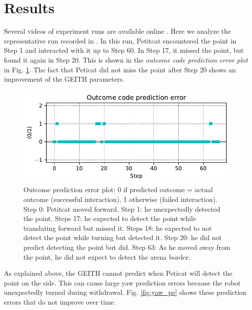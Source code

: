 \documentclass[runningheads]{llncs}
\begin{document}
\section{Results}
\label{sec:results}

Several videos of experiment runs are available online \cite{georgeon_petitcat_playlist}. 
Here we analyze the representative run recorded in \cite{georgeon_petitcat_2024}.
In this run, Petitcat encountered the point in Step 1 and interacted with it up to Step 60.
In Step 17, it missed the point, but found it again in Step 20.
This is shown in the \textit{outcome code prediction error plot} in Fig. \ref{fig:outcome}. 
The fact that Peticat did not miss the point after Step 20 shows an improvement of the GEITH parameters.

\begin{figure}
	\includegraphics[width=\textwidth]{01_Outcome_code.pdf}
	\caption{Outcome prediction error plot: 0 if predicted outcome = actual outcome (successful interaction), 1 otherwise (failed interaction).
	Step 0: Petitcat moved forward.
	Step 1: he unexpectedly detected the point.
	Steps 17: he expected to detect the point while translating forward but missed it.
	Steps 18: he expected to not detect the point while turning but detected it.
	Step 20: he did not predict detecting the point but did. 
	Step 63: As he moved away from the point, he did not expect to detect the arena border. } \label{fig:outcome}
\end{figure}

As explained above, the GEITH cannot predict when Peticat will detect the point on the side. 
This can cause large yaw prediction errors because the robot unexpectedly turned during withdrawal.
Fig. \ref{fig:yaw_pe} shows these prediction errors that do not improve over time. 
\end{document}
